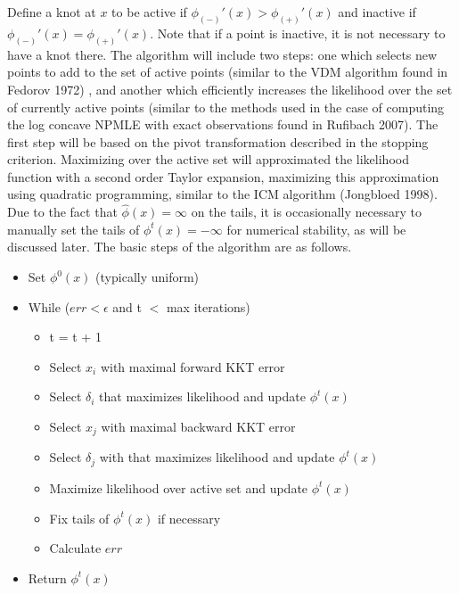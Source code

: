 \documentclass[10pt]{article}
\begin{document}
	Define a knot at $x$ to be active if $\phi_{(-)}'(x) > \phi_{(+)}'(x)$ and inactive if $\phi_{(-)}'(x) = \phi_{(+)}'(x)$. Note that if a point is inactive, it is not necessary to have a knot there. The algorithm will include two steps: one which selects new points to add to the set of active points (similar to the VDM algorithm found in Fedorov 1972) , and another which efficiently increases the likelihood over the set of currently active points (similar to the methods used in the case of computing the log concave NPMLE with exact observations found in Rufibach 2007). The first step will be based on the pivot transformation described in the stopping criterion. Maximizing over the active set will approximated the likelihood function with a second order Taylor expansion, maximizing this approximation using quadratic programming, similar to the ICM algorithm (Jongbloed 1998). Due to the fact that $\hat \phi(x) = \infty$ on the tails, it is occasionally necessary to manually set the tails of $\phi^t(x) = -\infty$ for numerical stability, as will be discussed later. The basic steps of the algorithm are as follows.
	
	\vspace{3mm}
	
	\begin{itemize}
	
		\item Set $\phi^0(x)$ (typically uniform)
		
		\item While ($err < \epsilon$ and t $<$ max iterations)
		
			\begin{itemize}
			
			\item t = t + 1
			
			\item Select $x_i$ with maximal forward KKT error
			
			\item Select $\delta_i$ that maximizes likelihood and update $\phi^t(x)$
			
			\item Select $x_j$ with maximal backward KKT error
			
			\item Select $\delta_j$ with that maximizes likelihood and update $\phi^t(x)$
			
			\item Maximize likelihood over active set and update $\phi^t(x)$
			
			\item Fix tails of $\phi^t(x)$ if necessary
			
			\item Calculate $err$
			
			\end{itemize}
	
	\item Return $\phi^t(x)$
	
	\end{itemize}
	
\end{document}
